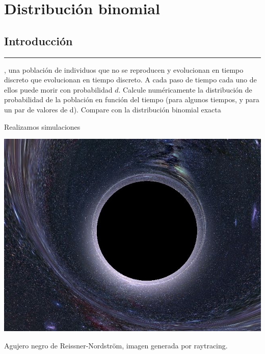 \chapter{\textcolor{myred}{Distribución binomial}}

\section{\huge{Introducción}}

\textcolor{myred}{\hrule}

, una población de individuos que no se reproducen y evolucionan en tiempo discreto que evolucionan en tiempo discreto. A cada paso de tiempo cada uno de ellos puede morir con probabilidad $d$. Calcule numéricamente la distribución de probabilidad de la población en función del tiempo (para algunos tiempos, y para un par de valores de d). Compare con la distribución
binomial exacta

Realizamos simulaciones 














\begin{marginfigure}
\captionsetup{type=figure}
    \centering
    \includegraphics[width=1.3\textwidth]{Im/3653b705a42ad6a980fc834e6ca39875.jpg}
    \caption{Agujero negro de Reissner-Nordström, imagen generada por raytracing.}
    \label{fig:sen}
\end{marginfigure}

